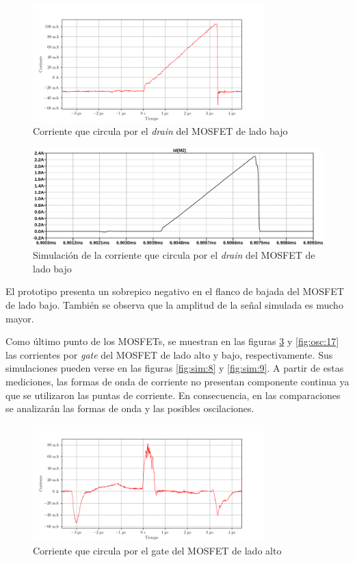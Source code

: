 \begin{figure}[H]
    \centering
    \includegraphics[width=0.8\textwidth]{images/capturas-osciloscopio/17-11-2022/22.png}
    \caption{Corriente que circula por el \textit{drain} del MOSFET de lado bajo}
    \label{fig:osc:22}
\end{figure}

\begin{figure}[H]
    \centering
    \includegraphics[width=\textwidth]{images/sim/11.pdf}
    \caption{Simulación de la corriente que circula por el \textit{drain} del MOSFET de lado bajo}
    \label{fig:sim:11}
\end{figure}

El prototipo presenta un sobrepico negativo en el flanco de bajada del MOSFET de lado bajo. 
También se observa que la amplitud de la señal simulada es mucho mayor.

Como último punto de los MOSFETs, se muestran en las figuras \ref{fig:osc:15} y \ref{fig:osc:17} las corrientes por \textit{gate} del MOSFET de lado alto y bajo, respectivamente.
Sus simulaciones pueden verse en las figuras \ref{fig:sim:8} y \ref{fig:sim:9}.
A partir de estas mediciones, las formas de onda de corriente no presentan componente continua ya que se utilizaron las puntas de corriente. En consecuencia, en las comparaciones se analizarán las formas de onda y las posibles oscilaciones. 

\begin{figure}[H]
    \centering
    \includegraphics[width=0.8\textwidth]{images/capturas-osciloscopio/17-11-2022/15.png}
    \caption{Corriente que circula por el gate del MOSFET de lado alto}
    \label{fig:osc:15}
\end{figure}
 

